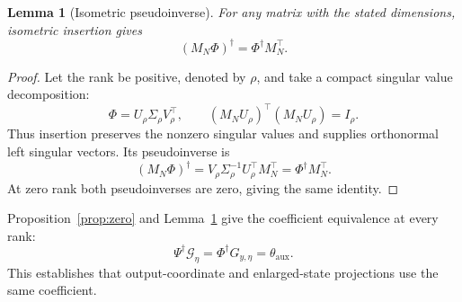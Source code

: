 \documentclass[11pt,a4paper]{article}
\newtheorem{lemma}{Lemma}
\begin{document}
\begin{lemma}[Isometric pseudoinverse]\label{lem:isometry}
For any matrix with the stated dimensions, isometric insertion gives
\begin{equation}\label{eq:isometricinverse}
(M_N\Phi)^\dagger=\Phi^\dagger M_N^\top.
\end{equation}
\end{lemma}
\begin{proof}
Let the rank be positive, denoted by \(\rho\), and take a compact singular value decomposition:
\begin{equation}\label{eq:svd}
\Phi=U_\rho\Sigma_\rho V_\rho^\top,\qquad
(M_NU_\rho)^\top(M_NU_\rho)=I_\rho.
\end{equation}
Thus insertion preserves the nonzero singular values and supplies orthonormal left singular vectors. Its pseudoinverse is
\begin{equation}\label{eq:svdinverse}
(M_N\Phi)^\dagger=V_\rho\Sigma_\rho^{-1}U_\rho^\top M_N^\top
=\Phi^\dagger M_N^\top.
\end{equation}
At zero rank both pseudoinverses are zero, giving the same identity.
\end{proof}
Proposition~\ref{prop:zero} and Lemma~\ref{lem:isometry} give the coefficient equivalence at every rank:
\begin{equation}\label{eq:coefficientidentity}
\boxed{\Psi^\dagger\mathcal G_\eta=\Phi^\dagger G_{y,\eta}=\theta_{\mathrm{aux}}.}
\end{equation}
This establishes that output-coordinate and enlarged-state projections use the same coefficient.
\end{document}
